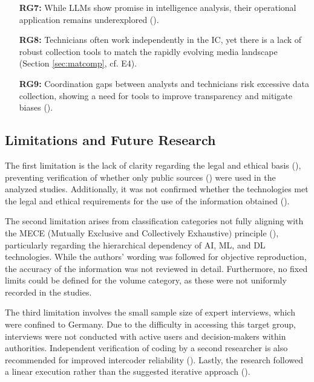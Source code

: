 \documentclass[10pt]{article}
\begin{document}
\begin{itemize}
    \item[\textbf{RG7:}] While LLMs show promise in intelligence analysis, their operational application remains underexplored (\cite{Radford.2023}).

    \item[\textbf{RG8:}] Technicians often work independently in the IC, yet there is a lack of robust collection tools to match the rapidly evolving media landscape (Section \ref{sec:matcomp}, cf. E4).

    \item[\textbf{RG9:}] Coordination gaps between analysts and technicians risk excessive data collection, showing a need for tools to improve transparency and mitigate biases (\cite{Lowenthal.2020}).
\end{itemize}

\subsection{Limitations and Future Research}

The first limitation is the lack of clarity regarding the legal and ethical basis (\cite{Ghioni.2023,Wittmer.2022}), preventing verification of whether only public sources (\cite{NorthAtlanticTreatyOrganization.2002}) were used in the analyzed studies. Additionally, it was not confirmed whether the technologies met the legal and ethical requirements for the use of the information obtained (\cite{PastorGalindo.2020,Wittmer.2022}).

The second limitation arises from classification categories not fully aligning with the MECE (Mutually Exclusive and Collectively Exhaustive) principle (\cite{Lee.2018}), particularly regarding the hierarchical dependency of AI, ML, and DL technologies. While the authors' wording was followed for objective reproduction, the accuracy of the information was not reviewed in detail. Furthermore, no fixed limits could be defined for the volume category, as these were not uniformly recorded in the studies.

The third limitation involves the small sample size of expert interviews, which were confined to Germany. Due to the difficulty in accessing this target group, interviews were not conducted with active users and decision-makers within authorities. Independent verification of coding by a second researcher is also recommended for improved intercoder reliability (\cite{Glaser.2009}). Lastly, the research followed a linear execution rather than the suggested iterative approach (\cite{Peffers.2007}).
\end{document}
